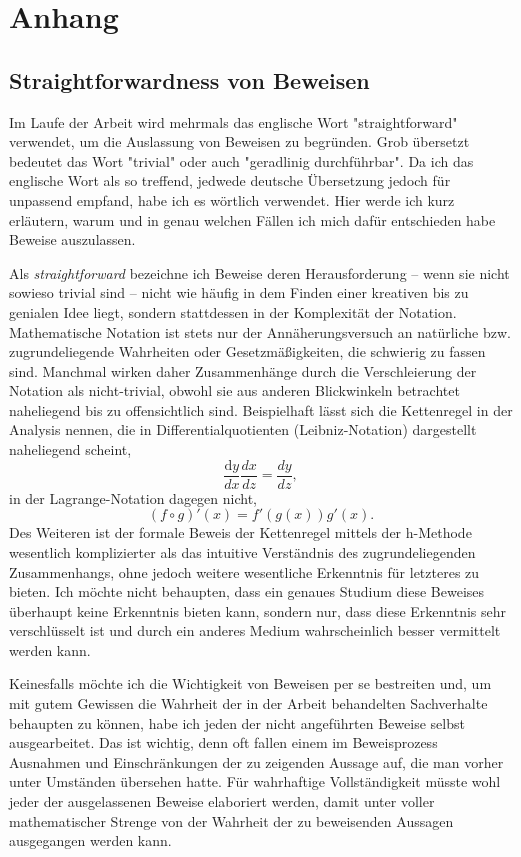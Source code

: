 \documentclass[a4paper,12pt,ngerman]{scrartcl}
\theoremstyle{plain}
\theoremstyle{plain}
\begin{document}
\section{Anhang}

\subsection{Straightforwardness von Beweisen}

Im Laufe der Arbeit wird mehrmals das englische Wort "straightforward" verwendet, um die Auslassung von Beweisen zu begründen. Grob übersetzt bedeutet das Wort "trivial" oder auch "geradlinig durchführbar". Da ich das englische Wort als so treffend, jedwede deutsche Übersetzung jedoch für unpassend empfand, habe ich es wörtlich verwendet. Hier werde ich kurz erläutern, warum und in genau welchen Fällen ich mich dafür entschieden habe Beweise auszulassen.

Als \textit{straightforward} bezeichne ich Beweise deren Herausforderung -- wenn sie nicht sowieso trivial sind -- nicht wie häufig in dem Finden einer kreativen bis zu genialen Idee liegt, sondern stattdessen in der Komplexität der Notation. Mathematische Notation ist stets nur der Annäherungsversuch an natürliche bzw. zugrundeliegende Wahrheiten oder Gesetzmäßigkeiten, die schwierig zu fassen sind. Manchmal wirken daher Zusammenhänge durch die Verschleierung der Notation als nicht-trivial, obwohl sie aus anderen Blickwinkeln betrachtet naheliegend bis zu offensichtlich sind. Beispielhaft lässt sich die Kettenregel in der Analysis nennen, die in Differentialquotienten (Leibniz-Notation) dargestellt naheliegend scheint,
\[ \frac{\mathrm{d}y}{dx}\frac{dx}{dz} = \frac{dy}{dz},\]
in der Lagrange-Notation dagegen nicht,
\[ (f\circ g)'(x) = f'(g(x))g'(x). \]
Des Weiteren ist der formale Beweis der Kettenregel mittels der h-Methode wesentlich komplizierter als das intuitive Verständnis des zugrundeliegenden Zusammenhangs, ohne jedoch weitere wesentliche Erkenntnis für letzteres zu bieten. Ich möchte nicht behaupten, dass ein genaues Studium diese Beweises überhaupt keine Erkenntnis bieten kann, sondern nur, dass diese Erkenntnis sehr verschlüsselt ist und durch ein anderes Medium wahrscheinlich besser vermittelt werden kann.

Keinesfalls möchte ich die Wichtigkeit von Beweisen per se bestreiten und, um mit gutem Gewissen die Wahrheit der in der Arbeit behandelten Sachverhalte behaupten zu können, habe ich jeden der nicht angeführten Beweise selbst ausgearbeitet. Das ist wichtig, denn oft fallen einem im Beweisprozess Ausnahmen und Einschränkungen der zu zeigenden Aussage auf, die man vorher unter Umständen übersehen hatte. Für wahrhaftige Vollständigkeit müsste wohl jeder der ausgelassenen Beweise elaboriert werden, damit unter voller mathematischer Strenge von der Wahrheit der zu beweisenden Aussagen ausgegangen werden kann. 
\end{document}
